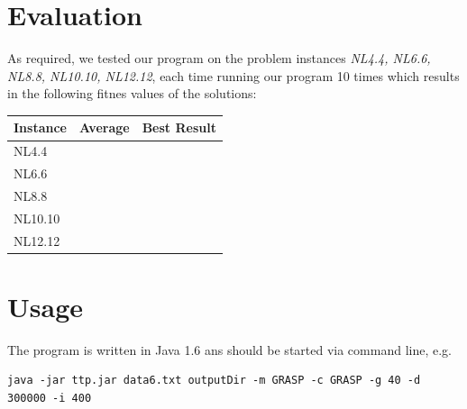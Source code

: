 \documentclass[a4paper,11pt]{article}
\begin{document}
\section{Evaluation}
As required, we tested our program on the problem instances 
\emph{NL4.4, NL6.6, NL8.8, NL10.10, NL12.12},
 each time running our program 10 times which results in the following fitnes values of the
solutions:

\begin{center}
\begin{tabular}{| l | r | r |}
  \hline                       
  Instance& Average  & Best Result \\   \hline     \hline    
  NL4.4 & &  \\ \hline    
  NL6.6 &  &  \\ \hline   
  NL8.8 &   &\\ \hline  
  NL10.10 &   &  \\ \hline 
  NL12.12 &   & \\ \hline
\end{tabular}
\end{center}


\section{Usage}
The program is written in Java 1.6 ans should be started via command line, e.g.
\lstset{language=sh}
\begin{lstlisting}
java -jar ttp.jar data6.txt outputDir -m GRASP -c GRASP -g 40 -d 300000 -i 400
\end{lstlisting}

\small


\end{document}
